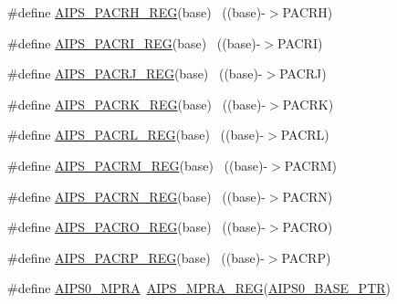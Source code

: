 \begin{DoxyCompactItemize}
\item 
\#define \hyperlink{group___a_i_p_s___register___accessor___macros_ga70fe12499dcff4c1cd86c407b7243603}{A\+I\+P\+S\+\_\+\+P\+A\+C\+R\+H\+\_\+\+R\+EG}(base)                                      ~((base)-\/$>$P\+A\+C\+RH)
\item 
\#define \hyperlink{group___a_i_p_s___register___accessor___macros_gae8f9e75bc6e77812a3e9814ef3edd1f7}{A\+I\+P\+S\+\_\+\+P\+A\+C\+R\+I\+\_\+\+R\+EG}(base)                                      ~((base)-\/$>$P\+A\+C\+RI)
\item 
\#define \hyperlink{group___a_i_p_s___register___accessor___macros_ga0d8e502845b69ce0b8dbfd16b115ee78}{A\+I\+P\+S\+\_\+\+P\+A\+C\+R\+J\+\_\+\+R\+EG}(base)                                      ~((base)-\/$>$P\+A\+C\+RJ)
\item 
\#define \hyperlink{group___a_i_p_s___register___accessor___macros_gad254171eacb0d0003ba2f458d3627682}{A\+I\+P\+S\+\_\+\+P\+A\+C\+R\+K\+\_\+\+R\+EG}(base)                                      ~((base)-\/$>$P\+A\+C\+RK)
\item 
\#define \hyperlink{group___a_i_p_s___register___accessor___macros_ga9f0835d43f92a09467da7cae7f5a602f}{A\+I\+P\+S\+\_\+\+P\+A\+C\+R\+L\+\_\+\+R\+EG}(base)                                      ~((base)-\/$>$P\+A\+C\+RL)
\item 
\#define \hyperlink{group___a_i_p_s___register___accessor___macros_ga85c559319333d83c01a7dcea1ac14bad}{A\+I\+P\+S\+\_\+\+P\+A\+C\+R\+M\+\_\+\+R\+EG}(base)                                      ~((base)-\/$>$P\+A\+C\+RM)
\item 
\#define \hyperlink{group___a_i_p_s___register___accessor___macros_gaa794b17b9de6a81bd01fc3bdeeafc5b2}{A\+I\+P\+S\+\_\+\+P\+A\+C\+R\+N\+\_\+\+R\+EG}(base)                                      ~((base)-\/$>$P\+A\+C\+RN)
\item 
\#define \hyperlink{group___a_i_p_s___register___accessor___macros_ga41ac26d457af78568e03b65f4ed71c71}{A\+I\+P\+S\+\_\+\+P\+A\+C\+R\+O\+\_\+\+R\+EG}(base)                                      ~((base)-\/$>$P\+A\+C\+RO)
\item 
\#define \hyperlink{group___a_i_p_s___register___accessor___macros_gadf1bac253f22b305685fdd87564a7660}{A\+I\+P\+S\+\_\+\+P\+A\+C\+R\+P\+\_\+\+R\+EG}(base)                                      ~((base)-\/$>$P\+A\+C\+RP)
\item 
\#define \hyperlink{group___a_i_p_s___register___accessor___macros_ga41bb0ce77a71c841504362985bac06d6}{A\+I\+P\+S0\+\_\+\+M\+P\+RA}~\hyperlink{group___a_i_p_s___register___accessor___macros_ga152616308133cf4081eccd2218dcc92f}{A\+I\+P\+S\+\_\+\+M\+P\+R\+A\+\_\+\+R\+EG}(\hyperlink{group___a_i_p_s___peripheral_ga6affb22d1dff0d01c843913f33f1c1a9}{A\+I\+P\+S0\+\_\+\+B\+A\+S\+E\+\_\+\+P\+TR})

\end{DoxyCompactItemize}
